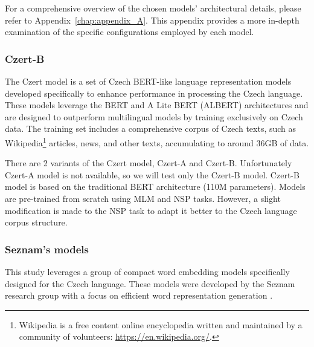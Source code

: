 For a comprehensive overview of the chosen models' architectural details, please refer to Appendix~\ref{chap:appendix_A}.
This appendix provides a more in-depth examination of the specific configurations employed by each model.

\subsubsection{Czert-B} \label{modelczert-b}

The Czert model \cite{sido2021czert} is a set of Czech \ac{BERT}-like language representation models developed specifically to enhance performance in processing the Czech language.
These models leverage the \ac{BERT} and A Lite \ac{BERT} (ALBERT) \cite{lan2020albert} architectures and are designed to outperform multilingual models by training exclusively on Czech data.
The training set includes a comprehensive corpus of Czech texts, such as Wikipedia\footnote{\label{footnote:wikipedia}Wikipedia is a free content online encyclopedia written and maintained by a community of volunteers: \url{https://en.wikipedia.org/}.} articles, news, and other texts, accumulating to around 36GB of data.

There are 2 variants of the Czert model, Czert-A and Czert-B. Unfortunately Czert-A model is not available, so we will test only the Czert-B model.
Czert-B model is based on the traditional \ac{BERT} architecture (110M parameters).
Models are pre-trained from scratch using \ac{MLM} and \ac{NSP} tasks. However, a slight modification is made to the \ac{NSP} task to adapt it better to the Czech language corpus structure.

\subsubsection{Seznam's models} \label{model:seznam}
This study leverages a group of compact word embedding models specifically designed for the Czech language.
These models were developed by the Seznam research group with a focus on efficient word representation generation \cite{bednář2023like}.

